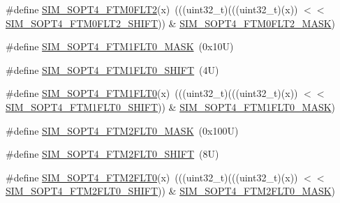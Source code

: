 \begin{DoxyCompactItemize}
\item 
\#define \mbox{\hyperlink{group___s_i_m___register___masks_gaf80758ae3d5375fd1323a1ba59daa8d5}{S\+I\+M\+\_\+\+S\+O\+P\+T4\+\_\+\+F\+T\+M0\+F\+L\+T2}}(x)~(((uint32\+\_\+t)(((uint32\+\_\+t)(x)) $<$$<$ \mbox{\hyperlink{group___s_i_m___register___masks_gacca0c622cfa1e0c7e7214096c38c6557}{S\+I\+M\+\_\+\+S\+O\+P\+T4\+\_\+\+F\+T\+M0\+F\+L\+T2\+\_\+\+S\+H\+I\+FT}})) \& \mbox{\hyperlink{group___s_i_m___register___masks_gafa0c4deac7488857fd22e28602b612fb}{S\+I\+M\+\_\+\+S\+O\+P\+T4\+\_\+\+F\+T\+M0\+F\+L\+T2\+\_\+\+M\+A\+SK}})
\item 
\#define \mbox{\hyperlink{group___s_i_m___register___masks_ga605f729e3f4faddc18e957c077adf61a}{S\+I\+M\+\_\+\+S\+O\+P\+T4\+\_\+\+F\+T\+M1\+F\+L\+T0\+\_\+\+M\+A\+SK}}~(0x10\+U)
\item 
\#define \mbox{\hyperlink{group___s_i_m___register___masks_ga9fb8861affd661f64719260a43a87ec6}{S\+I\+M\+\_\+\+S\+O\+P\+T4\+\_\+\+F\+T\+M1\+F\+L\+T0\+\_\+\+S\+H\+I\+FT}}~(4\+U)
\item 
\#define \mbox{\hyperlink{group___s_i_m___register___masks_ga007c3ff0f836a5c44abde0cfc7706d3a}{S\+I\+M\+\_\+\+S\+O\+P\+T4\+\_\+\+F\+T\+M1\+F\+L\+T0}}(x)~(((uint32\+\_\+t)(((uint32\+\_\+t)(x)) $<$$<$ \mbox{\hyperlink{group___s_i_m___register___masks_ga9fb8861affd661f64719260a43a87ec6}{S\+I\+M\+\_\+\+S\+O\+P\+T4\+\_\+\+F\+T\+M1\+F\+L\+T0\+\_\+\+S\+H\+I\+FT}})) \& \mbox{\hyperlink{group___s_i_m___register___masks_ga605f729e3f4faddc18e957c077adf61a}{S\+I\+M\+\_\+\+S\+O\+P\+T4\+\_\+\+F\+T\+M1\+F\+L\+T0\+\_\+\+M\+A\+SK}})
\item 
\#define \mbox{\hyperlink{group___s_i_m___register___masks_ga4f61f56a63a5d239be393708c17cf82c}{S\+I\+M\+\_\+\+S\+O\+P\+T4\+\_\+\+F\+T\+M2\+F\+L\+T0\+\_\+\+M\+A\+SK}}~(0x100\+U)
\item 
\#define \mbox{\hyperlink{group___s_i_m___register___masks_ga15275ae91c6efbf697f472b940369401}{S\+I\+M\+\_\+\+S\+O\+P\+T4\+\_\+\+F\+T\+M2\+F\+L\+T0\+\_\+\+S\+H\+I\+FT}}~(8\+U)
\item 
\#define \mbox{\hyperlink{group___s_i_m___register___masks_gabe26ee97adbc9d1d95687f3288a7bbd2}{S\+I\+M\+\_\+\+S\+O\+P\+T4\+\_\+\+F\+T\+M2\+F\+L\+T0}}(x)~(((uint32\+\_\+t)(((uint32\+\_\+t)(x)) $<$$<$ \mbox{\hyperlink{group___s_i_m___register___masks_ga15275ae91c6efbf697f472b940369401}{S\+I\+M\+\_\+\+S\+O\+P\+T4\+\_\+\+F\+T\+M2\+F\+L\+T0\+\_\+\+S\+H\+I\+FT}})) \& \mbox{\hyperlink{group___s_i_m___register___masks_ga4f61f56a63a5d239be393708c17cf82c}{S\+I\+M\+\_\+\+S\+O\+P\+T4\+\_\+\+F\+T\+M2\+F\+L\+T0\+\_\+\+M\+A\+SK}})
$$
\end{DoxyCompactItemize}
